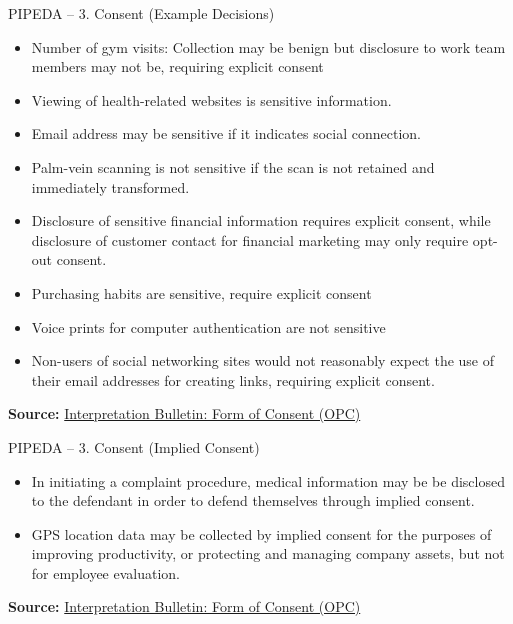 \documentclass[ignorenonframetext,xcolor=x11names]{beamer}
\begin{document}
\begin{frame}{PIPEDA -- 3. Consent \small (Example Decisions)}
\begin{itemize}
   \item Number of gym visits: Collection may be benign but disclosure to work team members may not be, requiring explicit consent
   \item Viewing of health-related websites is sensitive information.
   \item Email address may be sensitive if it indicates social connection.
   \item Palm-vein scanning is not sensitive if the scan is not retained and immediately transformed.
   \item Disclosure of sensitive financial information requires explicit consent, while disclosure of customer contact for financial marketing may only require opt-out consent.
   \item Purchasing habits are sensitive, require explicit consent
   \item Voice prints for computer authentication are not sensitive
   \item Non-users of social networking sites would not reasonably expect the use of their email addresses for creating links, requiring explicit consent.
\end{itemize}

\vspace{.5\baselineskip}
\scriptsize \textbf{Source:} \href{https://www.priv.gc.ca/en/privacy-topics/privacy-laws-in-canada/the-personal-information-protection-and-electronic-documents-act-pipeda/pipeda-compliance-help/pipeda-interpretation-bulletins/interpretations_07_consent/}{Interpretation Bulletin: Form of Consent (OPC)}
\end{frame}

\begin{frame}{PIPEDA -- 3. Consent \small (Implied Consent)}
\begin{itemize}
   \item In initiating a complaint procedure, medical information may be be disclosed to the defendant in order to defend themselves through implied consent.
   \item GPS location data may be collected by implied consent for the purposes of improving productivity, or protecting and managing company assets, but not for employee evaluation.
\end{itemize}

\scriptsize \textbf{Source:} \href{https://www.priv.gc.ca/en/privacy-topics/privacy-laws-in-canada/the-personal-information-protection-and-electronic-documents-act-pipeda/pipeda-compliance-help/pipeda-interpretation-bulletins/interpretations_07_consent/}{Interpretation Bulletin: Form of Consent (OPC)}
\end{frame}
\end{document}
